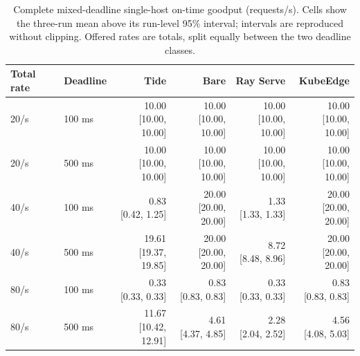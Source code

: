 \begin{table}[htbp]\centering\footnotesize
\caption{Complete mixed-deadline single-host on-time goodput (requests/s). Cells show the three-run mean above its run-level 95\% interval; intervals are reproduced without clipping. Offered rates are totals, split equally between the two deadline classes.}
\label{tab:full-mixed}
\begin{tabular}{llrrrr}\toprule
Total rate & Deadline & Tide & Bare & Ray Serve & KubeEdge\\\midrule
20/s & 100 ms & \shortstack{10.00\\{[10.00, 10.00]}} & \shortstack{10.00\\{[10.00, 10.00]}} & \shortstack{10.00\\{[10.00, 10.00]}} & \shortstack{10.00\\{[10.00, 10.00]}}\\[3pt]
20/s & 500 ms & \shortstack{10.00\\{[10.00, 10.00]}} & \shortstack{10.00\\{[10.00, 10.00]}} & \shortstack{10.00\\{[10.00, 10.00]}} & \shortstack{10.00\\{[10.00, 10.00]}}\\[3pt]
40/s & 100 ms & \shortstack{0.83\\{[0.42, 1.25]}} & \shortstack{20.00\\{[20.00, 20.00]}} & \shortstack{1.33\\{[1.33, 1.33]}} & \shortstack{20.00\\{[20.00, 20.00]}}\\[3pt]
40/s & 500 ms & \shortstack{19.61\\{[19.37, 19.85]}} & \shortstack{20.00\\{[20.00, 20.00]}} & \shortstack{8.72\\{[8.48, 8.96]}} & \shortstack{20.00\\{[20.00, 20.00]}}\\[3pt]
80/s & 100 ms & \shortstack{0.33\\{[0.33, 0.33]}} & \shortstack{0.83\\{[0.83, 0.83]}} & \shortstack{0.33\\{[0.33, 0.33]}} & \shortstack{0.83\\{[0.83, 0.83]}}\\[3pt]
80/s & 500 ms & \shortstack{11.67\\{[10.42, 12.91]}} & \shortstack{4.61\\{[4.37, 4.85]}} & \shortstack{2.28\\{[2.04, 2.52]}} & \shortstack{4.56\\{[4.08, 5.03]}}\\[3pt]
\bottomrule\end{tabular}\end{table}
